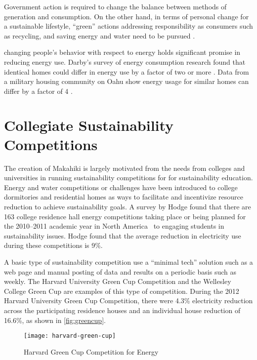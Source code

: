 Government action is required to change the balance between methods of generation and consumption. On the other hand, in terms of personal change for a sustainable lifestyle, ``green'' actions addressing responsibility as consumers such as recycling, and saving energy and water need to be pursued \cite{kagawa2007dissonance}.  

changing people's behavior with respect to energy holds significant promise in reducing energy use. Darby's survey of energy consumption research found that identical homes could differ in energy use by a factor of two or more \cite{darby-review-2006}. Data from a military housing community on Oahu show energy usage for similar homes can differ by a factor of 4 \cite{Norton2010ZeroEnergyHomes}.

\section{Collegiate Sustainability Competitions}
\label{sec:rel-competition}

The creation of Makahiki is largely motivated from the needs from colleges and universities in running sustainability competitions for for sustainability education. Energy and water competitions or challenges have been introduced to college dormitories and residential homes as ways to facilitate and incentivize resource reduction to achieve sustainability goals. A survey by Hodge found that there are 163 college residence hall energy competitions taking place or being planned for the 2010--2011 academic year in North America~\cite{Hodge2010} to engaging students in sustainability issues. Hodge found that the average reduction in electricity use during these competitions is 9\%. 

A basic type of sustainability competition use a ``minimal tech'' solution such as a web page and manual posting of data and results on a periodic basis such as weekly. The Harvard University Green Cup Competition \cite{harvard-green-cup} and the Wellesley College Green Cup \cite{wellesley-green-cup} are examples of this type of competition. During the 2012 Harvard University Green Cup Competition, there were 4.3\% electricity reduction across the participating residence houses and an individual house reduction of 16.6\%, as shown in \autoref{fig:greencup}.

\begin{figure}[ht!]
	\centering
		\texttt{[image: harvard-green-cup]}
		\caption{Harvard Green Cup Competition for Energy}
		\label{fig:greencup}
\end{figure}

